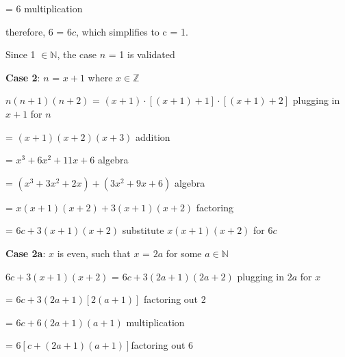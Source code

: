\documentclass{article} %
\begin{document}
    \tabto*{1cm}\tabto*{3.51cm} = $6$ \tabto*{7.3cm}multiplication
    
    \vspace*{0.08cm}

    \tabto*{1cm}therefore, 6 = 6$c$, which simplifies to c = 1.

    \tabto*{1cm}Since 1 $\in \mathbb{N}$, the case $n$ = 1 is validated

    \vspace*{0.2cm}
    
    \textbf{Case 2}: $n$ = $x + 1$ where $x \in \mathbb{Z}$
    \vspace*{0.08cm}

    \tabto*{1cm}$n(n + 1)(n + 2)$ = $(x + 1)\cdot [(x + 1) + 1]\cdot [(x + 1) + 2]$ \tabto*{9.6cm}plugging in $x+1$ for $n$
    \vspace*{0.08cm}

    \tabto*{3.51cm} = $(x + 1)(x + 2)(x + 3)$ \tabto*{9.6cm}addition
    \vspace*{0.08cm}

    \tabto*{3.51cm} = $x^3 + 6x^2 + 11x + 6$ \tabto*{9.6cm}algebra
    \vspace*{0.08cm}

    \tabto*{3.51cm} = $(x^3 +3x^2 + 2x) + (3x^2 + 9x + 6)$ \tabto*{9.6cm}algebra
    \vspace*{0.08cm}

    \tabto*{3.51cm} = $x(x+1)(x+2) + 3(x+1)(x+2)$ \tabto*{9.6cm}factoring
    \vspace*{0.08cm}

    \tabto*{3.51cm} = $6c + 3(x+1)(x+2)$ \tabto*{9.6cm}substitute $x(x+1)(x+2)$ for $6c$
    \vspace*{0.08cm}

    \tabto*{2cm} \textbf{Case 2a}: $x$ is even, such that $x$ = $2a$ for some $a \in \mathbb{N}$
    \vspace*{0.08cm}

    \tabto*{2cm} $6c + 3(x+1)(x+2)$ = $6c + 3(2a + 1)(2a + 2)$ \tabto*{9.5cm}plugging in $2a$ for $x$
    \vspace*{0.08cm}

    \tabto*{5.24cm} = $6c + 3(2a + 1)[2(a + 1)]$ \tabto*{9.5cm}factoring out 2
    \vspace*{0.08cm}

    \tabto*{5.24cm} = $6c + 6(2a + 1)(a + 1)$ \tabto*{9.5cm}multiplication
    \vspace*{0.08cm}
    
    \tabto*{5.24cm} = $6[c + (2a + 1)(a + 1)]$\tabto*{9.5cm}factoring out 6
    \vspace*{0.08cm}
\end{document}
